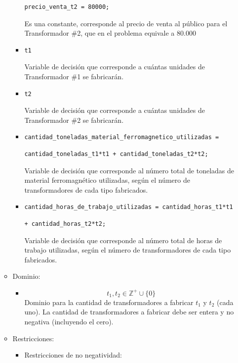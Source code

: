 \documentclass[12pt]{article}
\begin{document}
\begin{enumerate}[label=\alph*]
\begin{itemize}
\begin{itemize}
\begin{verbatim}
precio_venta_t2 = 80000;
\end{verbatim}
Es una constante, corresponde al precio de venta al público para el Transformador \#2, que en el problema equivale a 80.000
\item \begin{verbatim}
t1
\end{verbatim}
Variable de decisión que corresponde a cuántas unidades de Transformador \#1 se fabricarán.
\item \begin{verbatim}
t2
\end{verbatim}
Variable de decisión que corresponde a cuántas unidades de Transformador \#2 se fabricarán.
\item \begin{verbatim}
cantidad_toneladas_material_ferromagnetico_utilizadas = 
\end{verbatim} 
\begin{verbatim}
cantidad_toneladas_t1*t1 + cantidad_toneladas_t2*t2;
\end{verbatim}
Variable de decisión que corresponde al número total de toneladas de material ferromagnético utilizadas, según el número de transformadores de cada tipo fabricados.
\item \begin{verbatim}
cantidad_horas_de_trabajo_utilizadas = cantidad_horas_t1*t1 
\end{verbatim}
\begin{verbatim}
+ cantidad_horas_t2*t2;
\end{verbatim}
Variable de decisión que corresponde al número total de horas de trabajo utilizadas, según el número de transformadores de cada tipo fabricados.
\end{itemize}
\item Dominio: 
\begin{itemize}
\item \begin{equation*}
t_{1}, t_{2} \in \mathbb{Z}^{+} \cup \{0\}
\end{equation*}
Dominio para la cantidad de transformadores a fabricar $t_{1}$ y $t_{2}$ (cada uno). La cantidad de transformadores a fabricar debe ser entera y no negativa (incluyendo el cero).
\end{itemize}
\item Restricciones: 
\begin{itemize}
\item Restricciones de no negatividad:
\begin{equation*}

\end{equation*}
\end{itemize}
\end{itemize}
\end{enumerate}
\end{document}
